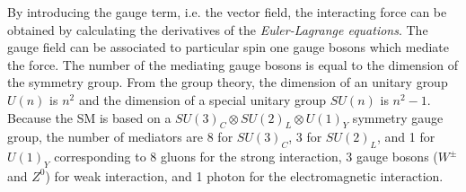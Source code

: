 %
By introducing the gauge term, i.e. the vector field, the interacting force can be obtained by calculating the derivatives of the \textit{Euler-Lagrange equations}.
The gauge field can be associated to particular spin one gauge bosons which mediate the force.
The number of the mediating gauge bosons is equal to the dimension of the symmetry group.
From the group theory, the dimension of an unitary group $U(n)$ is $n^{2}$ and the dimension of a special unitary group $SU(n)$ is $n^{2} - 1$.
Because the SM is based on a $SU(3)_{C} \otimes SU(2)_{L} \otimes U(1)_{Y}$ symmetry gauge group, the number of mediators are 8 for $SU(3)_{C}$, 3 for $SU(2)_{L}$, and 1 for $U(1)_{Y}$ corresponding to 8 gluons for the strong interaction, 3 gauge bosons ($W^{\pm}$ and $Z^{0}$) for weak interaction, and 1 photon for the electromagnetic interaction.



